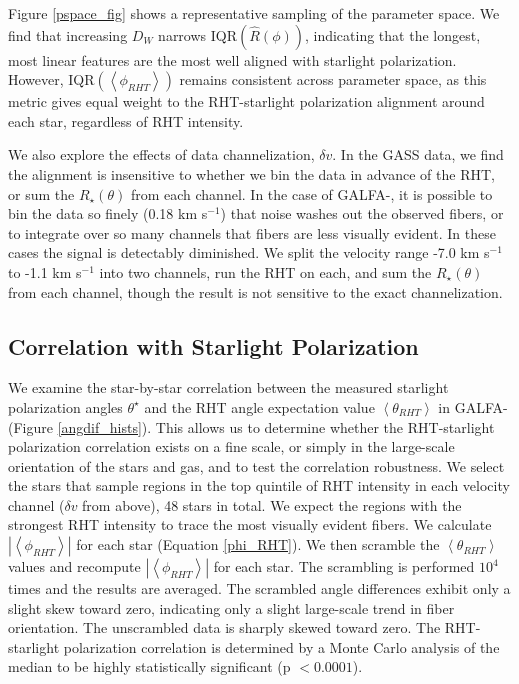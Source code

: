 Figure \ref{pspace_fig} shows a representative sampling of the parameter space. We find that increasing $D_W$ narrows IQR${({\hat{R}\left(\phi\right)})}$, indicating that the longest, most linear features are the most well aligned with starlight polarization. However, IQR${\left(\left<\phi_{RHT} \right>\right)}$ remains consistent across parameter space, as this metric gives equal weight to the RHT-starlight polarization alignment around each star, regardless of RHT intensity. 

We also explore the effects of data channelization, $\delta v$. In the GASS data, we find the alignment is insensitive to whether we bin the data in advance of the RHT, or sum the $R_\star\left(\theta\right)$ from each channel. In the case of GALFA-\hia, it is possible to bin the data so finely (0.18 km s${^{-1}}$) that noise washes out the observed fibers, or to integrate over so many channels that fibers are less visually evident. In these cases the signal is detectably diminished. We split the velocity range -7.0 km s${^{-1}}$ to -1.1 km s${^{-1}}$ into two channels, run the RHT on each, and sum the $R_\star\left(\theta\right)$ from each channel, though the result is not sensitive to the exact channelization. 

\subsection{Correlation with Starlight Polarization}\label{corrstarpol}

We examine the star-by-star correlation between the measured starlight polarization angles $\theta^\star$ and the RHT angle expectation value $\left<\theta_{RHT}\right>$ in GALFA-\hi (Figure \ref{angdif_hists}). This allows us to determine whether the RHT-starlight polarization correlation exists on a fine scale, or simply in the large-scale orientation of the stars and gas, and to test the correlation robustness. We select the stars that sample regions in the top quintile of RHT intensity in each velocity channel ($\delta v$ from above), 48 stars in total. We expect the regions with the strongest RHT intensity to trace the most visually evident fibers. We calculate $\left|\left<\phi_{RHT}\right>\right|$ for each star (Equation \ref{phi_RHT}). We then scramble the $\left<\theta_{RHT}\right>$ values and recompute $\left|\left<\phi_{RHT}\right>\right|$ for each star. The scrambling is performed $10^4$ times and the results are averaged. The scrambled angle differences exhibit only a slight skew toward zero, indicating only a slight large-scale trend in fiber orientation. The unscrambled data is sharply skewed toward zero. The RHT-starlight polarization correlation is determined by a Monte Carlo analysis of the median to be highly statistically significant (p $< 0.0001$).

